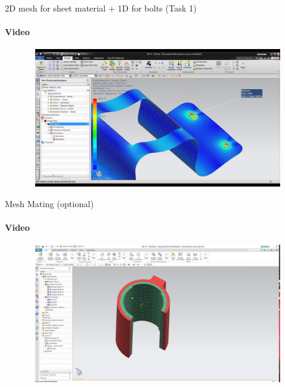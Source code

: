 \documentclass[aspectratio=169]{beamer}
\begin{document}
\begin{frame}[t]{2D mesh for sheet material + 1D for bolts (Task 1)}
    \framesubtitle{Video}
    \vspace{-0.6cm}
    \begin{figure}[H]
        \href{https://www.youtube.com/watch?v=3hZTIqXxq1o}{
            \centering\includegraphics[height=6cm,width=1\textwidth,keepaspectratio]{two_d_sheet_video.jpg}}
        \label{fig:two_d_sheet_video.jpg}
    \end{figure}
\end{frame}

\begin{frame}[t]{Mesh Mating (optional)}
    \framesubtitle{Video}
    \vspace{-0.6cm}
    \begin{figure}[H]
        \href{https://youtu.be/mHD2vp394AI}{
            \centering\includegraphics[height=6cm,width=1\textwidth,keepaspectratio]{mesh_mating_video.jpg}}
        \label{fig:mesh_mating_video.jpg}
    \end{figure}
\end{frame}
\end{document}
